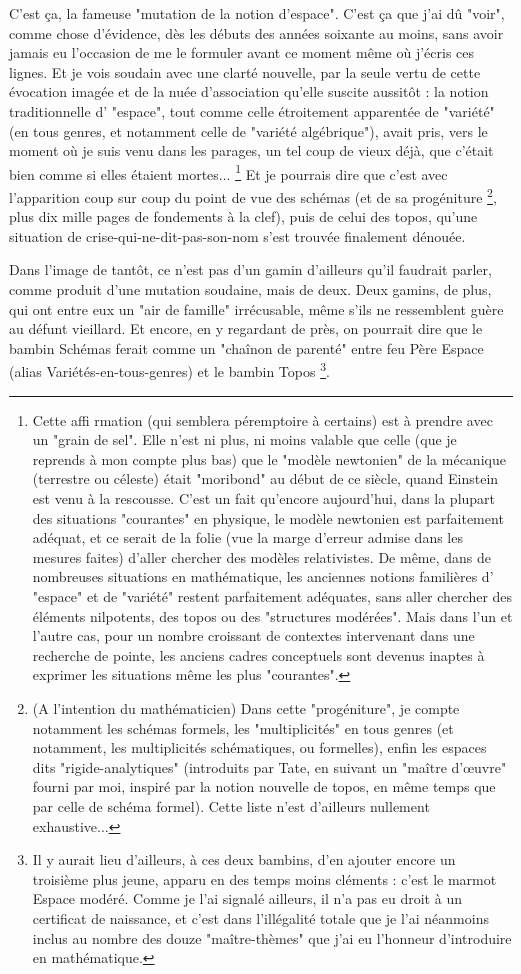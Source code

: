 C'est ça, la fameuse "mutation de la notion d'espace". C'est ça que j'ai dû "voir", comme chose d'évidence, dès les débuts des années soixante au moins, sans avoir jamais eu l'occasion de me le formuler avant ce moment même où j'écris ces lignes. Et je vois soudain avec une clarté nouvelle, par la seule vertu de cette évocation imagée et de la nuée d'association qu'elle suscite aussitôt : la notion traditionnelle d' "espace", tout comme celle étroitement apparentée de "variété" (en tous genres, et notamment celle de "variété algébrique"), avait pris, vers le moment où je suis venu dans les parages, un tel coup de vieux déjà, que c'était bien comme si elles étaient mortes... \footnote{Cette affi rmation (qui semblera péremptoire à certains) est à prendre avec un "grain de sel". Elle n'est ni plus, ni moins valable que celle (que je reprends à mon compte plus bas) que le "modèle newtonien" de la mécanique (terrestre ou céleste) était "moribond" au début de ce siècle, quand Einstein est venu à la rescousse. C'est un fait qu'encore aujourd'hui, dans la plupart des situations "courantes" en physique, le modèle newtonien est parfaitement adéquat, et ce serait de la folie (vue la marge d'erreur admise dans les mesures faites) d'aller chercher des modèles relativistes. De même, dans de nombreuses situations en mathématique, les anciennes notions familières d' "espace" et de "variété" restent parfaitement adéquates, sans aller chercher des éléments nilpotents, des topos ou des "structures modérées". Mais dans l'un et l'autre cas, pour un nombre croissant de contextes intervenant dans une recherche de pointe, les anciens cadres conceptuels sont devenus inaptes à exprimer les situations même les plus "courantes".} Et je pourrais dire que c'est avec l'apparition coup sur coup du point de vue des schémas (et de sa progéniture \footnote{(A l'intention du mathématicien) Dans cette "progéniture", je compte notamment les schémas formels, les "multiplicités" en tous genres (et notamment, les multiplicités schématiques, ou formelles), enfin les espaces dits "rigide-analytiques" (introduits par Tate, en suivant un "maître d'œuvre" fourni par moi, inspiré par la notion nouvelle de topos, en même temps que par celle de schéma formel). Cette liste n'est d'ailleurs nullement exhaustive...}, plus dix mille pages de fondements à la clef), puis de celui des topos, qu'une situation de crise-qui-ne-dit-pas-son-nom s'est trouvée finalement dénouée.

Dans l'image de tantôt, ce n'est pas d'un gamin d'ailleurs qu'il faudrait parler, comme produit d'une mutation soudaine, mais de deux. Deux gamins, de plus, qui ont entre eux un "air de famille" irrécusable, même s'ils ne ressemblent guère au défunt vieillard. Et encore, en y regardant de près, on pourrait dire que le bambin Schémas ferait comme un "chaînon de parenté" entre feu Père Espace (alias Variétés-en-tous-genres) et le bambin Topos \footnote{Il y aurait lieu d'ailleurs, à ces deux bambins, d'en ajouter encore un troisième plus jeune, apparu en des temps moins cléments : c'est le marmot Espace modéré. Comme je l'ai signalé ailleurs, il n'a pas eu droit à un certificat de naissance, et c'est dans l'illégalité totale que je l'ai néanmoins inclus au nombre des douze "maître-thèmes" que j'ai eu l'honneur d'introduire en mathématique.}.

